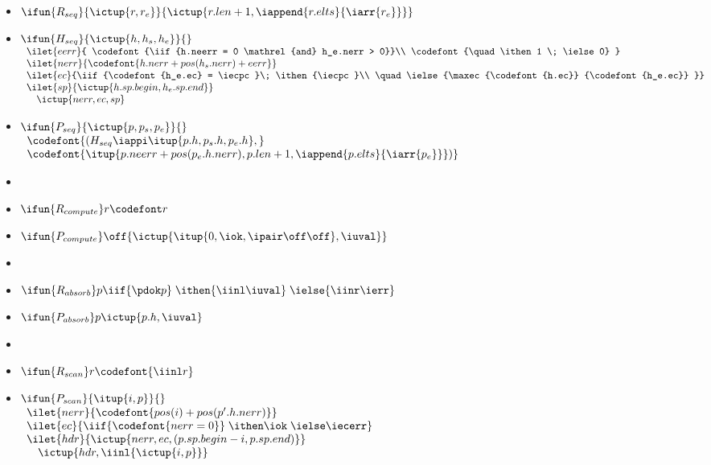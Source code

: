 {\begin{itemize}
\item $\ifun {R_{seq}} {\ictup{r, r_e}} 
  {\ictup{r.len+1,\iappend{r.elts} {\iarr{r_e}}}}$
\item $\ifun {H_{seq}} {\ictup{h, h_s, h_e}} {}$ \\
  $\begin{array}{l}
      \ilet {eerr} {
        \codefont{\iif {h.neerr = 0 \mathrel{and} h_e.nerr > 0}}\\
        \codefont{\quad \ithen 1 \;  \ielse 0}
      }\\
      \ilet {nerr} {\codefont{h.nerr + pos(h_s.nerr) + eerr}}\\
      \ilet {ec} {\iif{\codefont{h_e.ec} = \iecpc}\; \ithen {\iecpc}\\
      \quad \ielse{\maxec {\codefont{h.ec}} {\codefont{h_e.ec}}
          }} \\
      \ilet {sp} {\ictup{h.sp.begin,h_e.sp.end}} \\
      \quad \ictup {nerr,ec,sp}
    \end{array}$

\item $\ifun{P_{seq}} {\ictup{p, p_s, p_e}}{}$ \\ 
  $\begin{array}{l}
    \codefont{(H_{seq} \iappi \itup{p.h,p_s.h,p_e.h},}\\ 
    \codefont{\itup{p.neerr + pos(p_e.h.nerr), p.len + 1,\iappend {p.elts}
        {\iarr{p_e}}})}
  \end{array}$

\item %
\item $\ifun{R_{compute}} r {\codefont r}$
\item $\ifun{P_{compute}} \off {\ictup{\itup{0,\iok,\ipair \off \off},\iuval}}$

\item %
\item $\ifun {R_{absorb}} p {\iif {\pdok p}\; 
    \ithen {\iinl \iuval}\; \ielse {\iinr \ierr}}$
\item $\ifun {P_{absorb}} p {\ictup{p.h,\iuval}}$

\item %
\item $\ifun{R_{scan}} r  {\codefont{\iinl r}}$
\item $\ifun{P_{scan}} {\itup{i,p}} {}$ \\
$\begin{array}{l}
\ilet {nerr} {\codefont{pos(i) + pos(p'.h.nerr)}}\\
\ilet {ec} {\iif {\codefont{nerr = 0}}\; \ithen \iok\; \ielse \iecerr} \\
\ilet {hdr} {\ictup{nerr,ec,(p.sp.begin - i,p.sp.end)}} \\
\quad \ictup{hdr,\iinl {\ictup{i,p}}}
\end{array}$


\end{itemize}}
